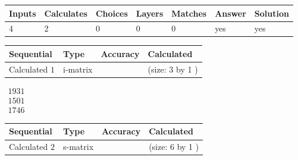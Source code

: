 \documentclass[12pt]{article}
\begin{document}
 
 
\noindent{}
 
 

 
 
 
\noindent{}
 
 

 
 
\noindent{}
 
 

 
\vspace{0.3in}
   
   
   
   
\noindent\begin{tabular}{|l|l|l|l|l|l|l|}
 \hline
Inputs & Calculates & Choices & Layers & Matches & Answer & Solution \\ \hline
           4  & 
           2  & 
           0
  & 
           0  & 
           0  & 
  yes & 
  yes 
  \\ \hline
 \end{tabular}
   
   
   
   
\noindent{}
   
   
  
  
\noindent\begin{tabular}{|l|l|l|l|}
\hline
 Sequential & Type & Accuracy & Calculated \\ 
\hline
 
 
  Calculated $            1 $ & i-matrix &  & 
 (size:            3  by            1 )
 \\  \hline  
 \end{tabular}
   
   
$\begin{array}{
 c
 }
        1931  \\ 
        1501  \\ 
        1746
 \end{array}  $ 
  
  
\noindent\begin{tabular}{|l|l|l|l|}
\hline
 Sequential & Type & Accuracy & Calculated \\ 
\hline
 
 
  Calculated $            2 $ & s-matrix & & 
 (size:            6  by            1 )
 \\  \hline  
 \end{tabular}
   
\end{document}
